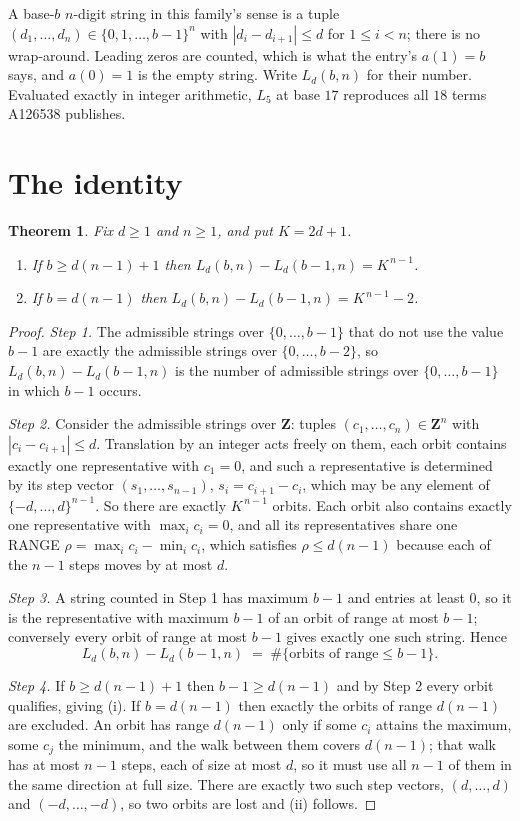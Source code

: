 \documentclass[11pt,a4paper]{article}
\theoremstyle{plain}
\newtheorem{theorem}{Theorem}
\theoremstyle{definition}
\begin{document}
A base-$b$ $n$-digit string in this family's sense is a tuple
$(d_1,\dots,d_n)\in\{0,1,\dots,b-1\}^{n}$ with $|d_i-d_{i+1}|\le d$ for $1\le i<n$; there
is no wrap-around. Leading zeros are counted, which is what the entry's $a(1)=b$ says, and
$a(0)=1$ is the empty string. Write $L_d(b,n)$ for their number. Evaluated exactly in integer
arithmetic, $L_{5}$ at base $17$ reproduces all $18$ terms A126538 publishes.

\section{The identity}

\begin{theorem}
Fix $d\ge1$ and $n\ge1$, and put $K=2d+1$.
\begin{enumerate}
\item[(i)] If $b\ge d(n-1)+1$ then $L_d(b,n)-L_d(b-1,n)=K^{\,n-1}$.
\item[(ii)] If $b=d(n-1)$ then $L_d(b,n)-L_d(b-1,n)=K^{\,n-1}-2$.
\end{enumerate}
\end{theorem}

\begin{proof}
\emph{Step 1.} The admissible strings over $\{0,\dots,b-1\}$ that do not use the value $b-1$
are exactly the admissible strings over $\{0,\dots,b-2\}$, so $L_d(b,n)-L_d(b-1,n)$ is the
number of admissible strings over $\{0,\dots,b-1\}$ in which $b-1$ occurs.

\emph{Step 2.} Consider the admissible strings over $\mathbf{Z}$: tuples
$(c_1,\dots,c_n)\in\mathbf{Z}^{n}$ with $|c_i-c_{i+1}|\le d$. Translation by an integer acts
freely on them, each orbit contains exactly one representative with $c_1=0$, and such a
representative is determined by its step vector $(s_1,\dots,s_{n-1})$, $s_i=c_{i+1}-c_i$,
which may be any element of $\{-d,\dots,d\}^{n-1}$. So there are exactly $K^{\,n-1}$ orbits.
Each orbit also contains exactly one representative with $\max_i c_i=0$, and all its
representatives share one RANGE $\rho=\max_ic_i-\min_ic_i$, which satisfies
$\rho\le d(n-1)$ because each of the $n-1$ steps moves by at most $d$.

\emph{Step 3.} A string counted in Step 1 has maximum $b-1$ and entries at least $0$, so it is
the representative with maximum $b-1$ of an orbit of range at most $b-1$; conversely every orbit
of range at most $b-1$ gives exactly one such string. Hence
\[
L_d(b,n)-L_d(b-1,n)\;=\;\#\{\text{orbits of range}\le b-1\} .
\]

\emph{Step 4.} If $b\ge d(n-1)+1$ then $b-1\ge d(n-1)$ and by Step 2 every orbit qualifies,
giving (i). If $b=d(n-1)$ then exactly the orbits of range $d(n-1)$ are excluded. An orbit has
range $d(n-1)$ only if some $c_i$ attains the maximum, some $c_j$ the minimum, and the walk
between them covers $d(n-1)$; that walk has at most $n-1$ steps, each of size at most $d$, so it
must use all $n-1$ of them in the same direction at full size. There are exactly two such step
vectors, $(d,\dots,d)$ and $(-d,\dots,-d)$, so two orbits are lost and (ii) follows.
\end{proof}
\end{document}
